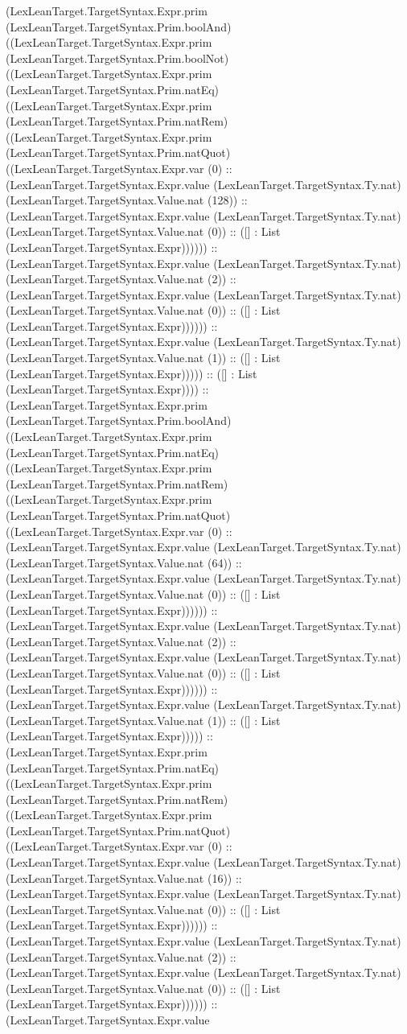 \documentclass[11pt]{article}
\begin{document}
(LexLeanTarget.TargetSyntax.Expr.prim (LexLeanTarget.TargetSyntax.Prim.boolAnd) ((LexLeanTarget.TargetSyntax.Expr.prim (LexLeanTarget.TargetSyntax.Prim.boolNot) ((LexLeanTarget.TargetSyntax.Expr.prim (LexLeanTarget.TargetSyntax.Prim.natEq) ((LexLeanTarget.TargetSyntax.Expr.prim (LexLeanTarget.TargetSyntax.Prim.natRem) ((LexLeanTarget.TargetSyntax.Expr.prim (LexLeanTarget.TargetSyntax.Prim.natQuot) ((LexLeanTarget.TargetSyntax.Expr.var (0) :: (LexLeanTarget.TargetSyntax.Expr.value (LexLeanTarget.TargetSyntax.Ty.nat) (LexLeanTarget.TargetSyntax.Value.nat (128)) :: (LexLeanTarget.TargetSyntax.Expr.value (LexLeanTarget.TargetSyntax.Ty.nat) (LexLeanTarget.TargetSyntax.Value.nat (0)) :: ([] : List (LexLeanTarget.TargetSyntax.Expr)))))) :: (LexLeanTarget.TargetSyntax.Expr.value (LexLeanTarget.TargetSyntax.Ty.nat) (LexLeanTarget.TargetSyntax.Value.nat (2)) :: (LexLeanTarget.TargetSyntax.Expr.value (LexLeanTarget.TargetSyntax.Ty.nat) (LexLeanTarget.TargetSyntax.Value.nat (0)) :: ([] : List (LexLeanTarget.TargetSyntax.Expr)))))) :: (LexLeanTarget.TargetSyntax.Expr.value (LexLeanTarget.TargetSyntax.Ty.nat) (LexLeanTarget.TargetSyntax.Value.nat (1)) :: ([] : List (LexLeanTarget.TargetSyntax.Expr))))) :: ([] : List (LexLeanTarget.TargetSyntax.Expr)))) :: (LexLeanTarget.TargetSyntax.Expr.prim (LexLeanTarget.TargetSyntax.Prim.boolAnd) ((LexLeanTarget.TargetSyntax.Expr.prim (LexLeanTarget.TargetSyntax.Prim.natEq) ((LexLeanTarget.TargetSyntax.Expr.prim (LexLeanTarget.TargetSyntax.Prim.natRem) ((LexLeanTarget.TargetSyntax.Expr.prim (LexLeanTarget.TargetSyntax.Prim.natQuot) ((LexLeanTarget.TargetSyntax.Expr.var (0) :: (LexLeanTarget.TargetSyntax.Expr.value (LexLeanTarget.TargetSyntax.Ty.nat) (LexLeanTarget.TargetSyntax.Value.nat (64)) :: (LexLeanTarget.TargetSyntax.Expr.value (LexLeanTarget.TargetSyntax.Ty.nat) (LexLeanTarget.TargetSyntax.Value.nat (0)) :: ([] : List (LexLeanTarget.TargetSyntax.Expr)))))) :: (LexLeanTarget.TargetSyntax.Expr.value (LexLeanTarget.TargetSyntax.Ty.nat) (LexLeanTarget.TargetSyntax.Value.nat (2)) :: (LexLeanTarget.TargetSyntax.Expr.value (LexLeanTarget.TargetSyntax.Ty.nat) (LexLeanTarget.TargetSyntax.Value.nat (0)) :: ([] : List (LexLeanTarget.TargetSyntax.Expr)))))) :: (LexLeanTarget.TargetSyntax.Expr.value (LexLeanTarget.TargetSyntax.Ty.nat) (LexLeanTarget.TargetSyntax.Value.nat (1)) :: ([] : List (LexLeanTarget.TargetSyntax.Expr))))) :: (LexLeanTarget.TargetSyntax.Expr.prim (LexLeanTarget.TargetSyntax.Prim.natEq) ((LexLeanTarget.TargetSyntax.Expr.prim (LexLeanTarget.TargetSyntax.Prim.natRem) ((LexLeanTarget.TargetSyntax.Expr.prim (LexLeanTarget.TargetSyntax.Prim.natQuot) ((LexLeanTarget.TargetSyntax.Expr.var (0) :: (LexLeanTarget.TargetSyntax.Expr.value (LexLeanTarget.TargetSyntax.Ty.nat) (LexLeanTarget.TargetSyntax.Value.nat (16)) :: (LexLeanTarget.TargetSyntax.Expr.value (LexLeanTarget.TargetSyntax.Ty.nat) (LexLeanTarget.TargetSyntax.Value.nat (0)) :: ([] : List (LexLeanTarget.TargetSyntax.Expr)))))) :: (LexLeanTarget.TargetSyntax.Expr.value (LexLeanTarget.TargetSyntax.Ty.nat) (LexLeanTarget.TargetSyntax.Value.nat (2)) :: (LexLeanTarget.TargetSyntax.Expr.value (LexLeanTarget.TargetSyntax.Ty.nat) (LexLeanTarget.TargetSyntax.Value.nat (0)) :: ([] : List (LexLeanTarget.TargetSyntax.Expr)))))) :: (LexLeanTarget.TargetSyntax.Expr.value 
\end{document}
